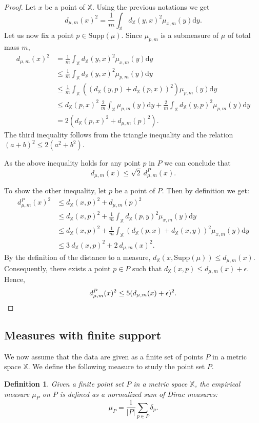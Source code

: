 \documentclass[a4paper]{article}
\newcommand\dm{d_{\mu,m}}
\newcommand\dPm{d_{\mu,m}^P}
\newcommand\X{\mathbb{X}}
\newcommand\dX[2]{d_\X(#1,#2)}
\newcommand\Supp[1]{\mathrm{Supp}(#1)}
\newcommand\dy{\mathrm{d}y}
\newtheorem{definition}[theorem]{Definition}
\begin{document}
\begin{proof}
Let $x$ be a point of $\X$. 
Using the previous notations we get
\[
  \dm(x)^2=\frac{1}{m}\int_{\X}\dX{y}{x}^2\mu_{x,m}(y)\dy.
\]
Let us now fix a point $p\in \Supp{\mu}$.
Since $\mu_{p,m}$ is a submeasure of $\mu$ of total mass $m$,
\begin{align*}
\dm(x)^2
&=\frac{1}{m}\int_{\X}\dX{y}{x}^2\mu_{x,m}(y)\dy\\
&\leq\frac{1}{m}\int_{\X}\dX{y}{x}^2\mu_{p,m}(y)\dy\\
&\leq\frac{1}{m}\int_{\X}((\dX{y}{p}+\dX{p}{x})^2)\mu_{p,m}(y)\dy\\
&\leq\dX{p}{x}^2\ \frac{2}{m}\int_\X\mu_{p,m}(y)\dy+\frac{2}{m}\int_{\X}\dX{y}{p}^2\mu_{p,m}(y)\dy\\
&=2(\dX{p}{x}^2+\dm(p)^2).
\end{align*}
The third inequality follows from the triangle inequality and the relation $(a+b)^2\leq2(a^2+b^2)$.

As the above inequality holds for any point $p$ in $P$ we can conclude that
\[
  \dm(x)\leq\sqrt{2}\ \dPm(x).
\]

To show the other inequality, let $p$ be a point of $P$.
Then by definition we get:
\begin{align*}
\dPm(x)^2
&\leq\dX{x}{p}^2+\dm(p)^2\\
&\leq\dX{x}{p}^2+\frac{1}{m}\int_{\X}\dX{p}{y}^2\mu_{x,m}(y)\dy\\
&\leq\dX{x}{p}^2+\frac{1}{m}\int_{\X}(\dX{p}{x}+\dX{x}{y})^2\mu_{x,m}(y)\dy\\
&\leq3\ \dX{x}{p}^2+2\ \dm(x)^2.
\end{align*}
By the definition of the distance to a measure, $\dX{x}{\Supp{\mu}}\leq\dm(x)$.
Consequently, there exists a point $p\in P$ such that $\dX{x}{p}\leq\dm(x)+\epsilon$.
Hence,
\[
  \dPm(x)^2\leq5(\dm(x)+\epsilon)^2.\qedhere
\]
\end{proof}

\subsection{Measures with finite support}\label{sRestrict}

We now assume that the data are given as a finite set of points $P$ in a metric space $\X$.
We define the following measure to study the point set $P$.

\begin{definition}
Given a finite point set $P$ in a metric space $\X$, the \emph{empirical measure} $\mu_P$ on $P$ is defined as a normalized sum of Dirac measures:
\[
  \mu_P=\frac{1}{|P|}\sum_{p\in P}\delta_p.
\]
\end{definition}
\end{document}
